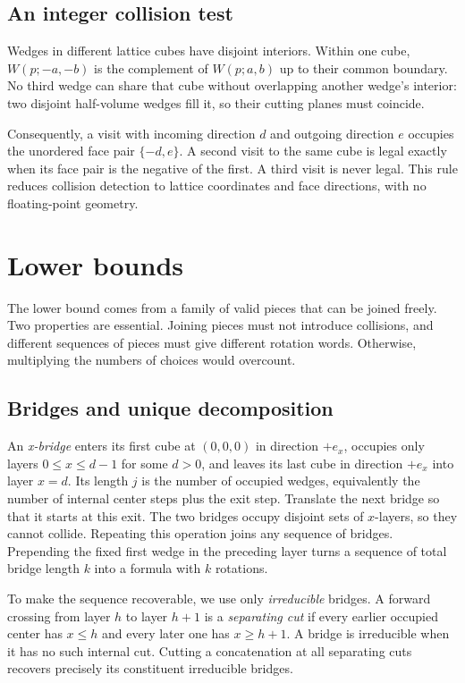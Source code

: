 \documentclass[11pt]{article}
\begin{document}
\subsection{An integer collision test}

Wedges in different lattice cubes have disjoint interiors.
Within one cube, $W(p;-a,-b)$ is the complement of $W(p;a,b)$ up to
their common boundary. No third wedge can share that cube without
overlapping another wedge's interior: two disjoint half-volume wedges fill it,
so their cutting planes must coincide.

Consequently, a visit with incoming direction $d$ and outgoing
direction $e$ occupies the unordered face pair $\{-d,e\}$.
A second visit to the same cube is legal exactly when its face pair
is the negative of the first. A third visit is never legal.
This rule reduces collision detection to lattice coordinates and
face directions, with no floating-point geometry.

\section{Lower bounds}\label{sec:lower}

The lower bound comes from a family of valid pieces that can be
joined freely. Two properties are essential. Joining pieces must
not introduce collisions, and different sequences of pieces must
give different rotation words. Otherwise, multiplying the numbers
of choices would overcount.

\subsection{Bridges and unique decomposition}

An \emph{x-bridge} enters its first cube at $(0,0,0)$ in direction
$+e_x$, occupies only layers $0\leq x\leq d-1$ for some $d>0$,
and leaves its last cube in direction $+e_x$ into layer $x=d$.
Its length $j$ is the number of occupied wedges, equivalently the
number of internal center steps plus the exit step.
Translate the next bridge so that it starts at this exit.
The two bridges occupy disjoint sets of $x$-layers, so they cannot
collide. Repeating this operation joins any sequence of bridges.
Prepending the fixed first wedge in the preceding layer turns a
sequence of total bridge length $k$ into a formula with $k$ rotations.

To make the sequence recoverable, we use only \emph{irreducible}
bridges. A forward crossing from layer $h$ to layer $h+1$ is a
\emph{separating cut} if every earlier occupied center has $x\leq h$
and every later one has $x\geq h+1$.
A bridge is irreducible when it has no such internal cut.
Cutting a concatenation at all separating cuts recovers precisely
its constituent irreducible bridges.
\end{document}
